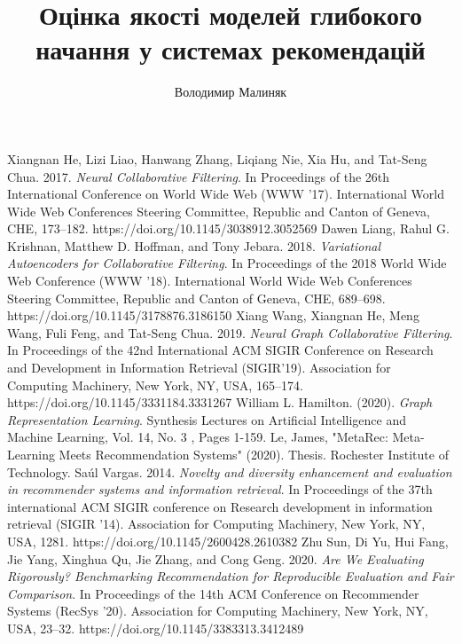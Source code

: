 \documentclass[a4paper,14pt, ukrainian]{extarticle}
\title{Оцінка якості моделей глибокого начання у системах рекомендацій}
\author{Володимир Малиняк}
\numberwithin{equation}{section}
\DeclareRobustCommand{\[}{\begin{equation}}
\DeclareRobustCommand{\]}{\end{equation}}
\begin{document}

\thispagestyle{empty}
\onehalfspacing
\newpage
\tableofcontents










\newpage
\begin{thebibliography}{99}
    Xiangnan He, Lizi Liao, Hanwang Zhang, Liqiang Nie, Xia Hu, and Tat-Seng Chua. 2017.  \emph{Neural Collaborative Filtering}. In Proceedings of the 26th International Conference on World Wide Web (WWW '17). International World Wide Web Conferences Steering Committee, Republic and Canton of Geneva, CHE, 173–182. https://doi.org/10.1145/3038912.3052569
    Dawen Liang, Rahul G. Krishnan, Matthew D. Hoffman, and Tony Jebara. 2018. \emph{Variational Autoencoders for Collaborative Filtering}. In Proceedings of the 2018 World Wide Web Conference (WWW '18). International World Wide Web Conferences Steering Committee, Republic and Canton of Geneva, CHE, 689–698. https://doi.org/10.1145/3178876.3186150
    Xiang Wang, Xiangnan He, Meng Wang, Fuli Feng, and Tat-Seng Chua. 2019. \emph{Neural Graph Collaborative Filtering}. In Proceedings of the 42nd International ACM SIGIR Conference on Research and Development in Information Retrieval (SIGIR'19). Association for Computing Machinery, New York, NY, USA, 165–174. https://doi.org/10.1145/3331184.3331267
    William L. Hamilton. (2020). \emph{Graph Representation Learning}. Synthesis Lectures on Artificial Intelligence and Machine Learning, Vol. 14, No. 3 , Pages 1-159.
    Le, James, "MetaRec: Meta-Learning Meets Recommendation Systems" (2020). Thesis. Rochester Institute of Technology.
    Saúl Vargas. 2014. \emph{Novelty and diversity enhancement and evaluation in recommender systems and information retrieval}. In Proceedings of the 37th international ACM SIGIR conference on Research  development in information retrieval (SIGIR '14). Association for Computing Machinery, New York, NY, USA, 1281. https://doi.org/10.1145/2600428.2610382
    Zhu Sun, Di Yu, Hui Fang, Jie Yang, Xinghua Qu, Jie Zhang, and Cong Geng. 2020. \emph{Are We Evaluating Rigorously? Benchmarking Recommendation for Reproducible Evaluation and Fair Comparison}. In Proceedings of the 14th ACM Conference on Recommender Systems (RecSys '20). Association for Computing Machinery, New York, NY, USA, 23–32. https://doi.org/10.1145/3383313.3412489

\end{thebibliography}
\end{document}
